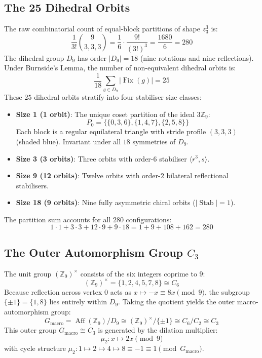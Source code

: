 \subsection{The 25 Dihedral Orbits}

The raw combinatorial count of equal-block partitions of shape $z_3^3$ is:
\[
\frac{1}{3!}\binom{9}{3, 3, 3} = \frac{1}{6} \cdot \frac{9!}{(3!)^3} = \frac{1680}{6} = 280
\]
The dihedral group $D_9$ has order $|D_9| = 18$ (nine rotations and nine reflections). Under Burnside's Lemma, the number of non-equivalent dihedral orbits is:
\[
\frac{1}{18} \sum_{g \in D_9} |\operatorname{Fix}(g)| = 25
\]
These $25$ dihedral orbits stratify into four stabiliser size classes:
\begin{itemize}
    \item \textbf{Size 1 (1 orbit)}: The unique coset partition of the ideal $3\mathbb{Z}_9$:
    \[
    P_0 = \{\{0, 3, 6\}, \{1, 4, 7\}, \{2, 5, 8\}\}
    \]
    Each block is a regular equilateral triangle with stride profile $(3, 3, 3)$ (shaded blue). Invariant under all $18$ symmetries of $D_9$.
    \item \textbf{Size 3 (3 orbits)}: Three orbits with order-$6$ stabiliser $\langle r^3, s \rangle$.
    \item \textbf{Size 9 (12 orbits)}: Twelve orbits with order-$2$ bilateral reflectional stabilisers.
    \item \textbf{Size 18 (9 orbits)}: Nine fully asymmetric chiral orbits ($|\operatorname{Stab}| = 1$).
\end{itemize}
The partition sum accounts for all $280$ configurations:
\[
1 \cdot 1 + 3 \cdot 3 + 12 \cdot 9 + 9 \cdot 18 = 1 + 9 + 108 + 162 = 280
\]

\subsection{The Outer Automorphism Group \texorpdfstring{$C_3$}{C3}}

The unit group $(\mathbb{Z}_9)^\times$ consists of the six integers coprime to $9$:
\[
(\mathbb{Z}_9)^\times = \{1, 2, 4, 5, 7, 8\} \cong C_6
\]
Because reflection across vertex $0$ acts as $x \mapsto -x \equiv 8x \pmod 9$, the subgroup $\{\pm 1\} = \{1, 8\}$ lies entirely within $D_9$. Taking the quotient yields the outer macro-automorphism group:
\[
G_{\text{macro}} = \operatorname{Aff}(\mathbb{Z}_9) / D_9 \cong (\mathbb{Z}_9)^\times / \{\pm 1\} \cong C_6 / C_2 \cong C_3
\]
This outer group $G_{\text{macro}} \cong C_3$ is generated by the dilation multiplier:
\[
\mu_2 \colon x \mapsto 2x \pmod 9
\]
with cycle structure $\mu_2 \colon 1 \mapsto 2 \mapsto 4 \mapsto 8 \equiv -1 \equiv 1 \pmod{G_{\text{macro}}}$.

